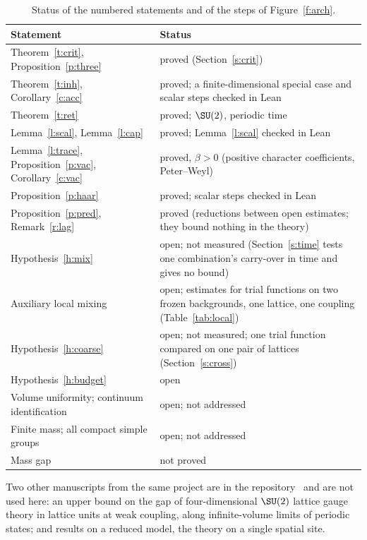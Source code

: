 \begin{table}[ht]
\centering\small
\begin{tabular}{@{}p{}p{}@{}}
\toprule
Statement & Status \\
\midrule
Theorem~\ref{t:crit}, Proposition~\ref{p:three} & proved (Section~\ref{s:crit}) \\
Theorem~\ref{t:inh}, Corollary~\ref{c:acc} & proved; a finite-dimensional special case and scalar steps checked in Lean \\
Theorem~\ref{t:ret} & proved; $\SU(2)$, periodic time \\
Lemma~\ref{l:scal}, Lemma~\ref{l:cap} & proved; Lemma~\ref{l:scal} checked in Lean \\
Lemma~\ref{l:trace}, Proposition~\ref{p:vac}, Corollary~\ref{c:vac} & proved, $\beta>0$ (positive character coefficients, Peter--Weyl) \\
Proposition~\ref{p:haar} & proved; scalar steps checked in Lean \\
Proposition~\ref{p:pred}, Remark~\ref{r:lag} & proved (reductions between open estimates; they bound nothing in the theory) \\
Hypothesis~\ref{h:mix} & open; not measured (Section~\ref{s:time} tests one combination's carry-over in time and gives no bound) \\
Auxiliary local mixing & open; estimates for trial functions on two frozen backgrounds, one lattice, one coupling (Table~\ref{tab:local}) \\
Hypothesis~\ref{h:coarse} & open; not measured; one trial function compared on one pair of lattices (Section~\ref{s:cross}) \\
Hypothesis~\ref{h:budget} & open \\
Volume uniformity; continuum identification & open; not addressed \\
Finite mass; all compact simple groups & open; not addressed \\
Mass gap & not proved \\
\bottomrule
\end{tabular}
\caption{Status of the numbered statements and of the steps of Figure~\ref{f:arch}.}\label{tab:status}
\end{table}

Two other manuscripts from the same project are in the repository~\cite{Repo} and are not used here: an
upper bound on the gap of four-dimensional $\SU(2)$ lattice gauge theory in lattice units at weak coupling,
along infinite-volume limits of periodic states; and results on a reduced model, the theory on a single
spatial site.

